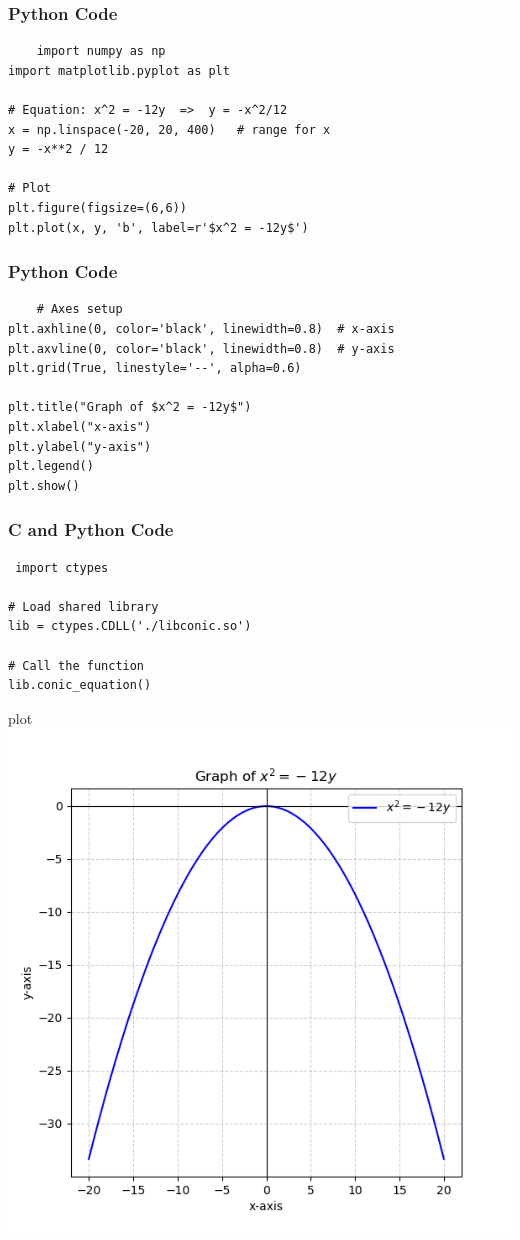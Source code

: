 \documentclass{beamer}
\begin{document}
\begin{frame}[fragile]
\frametitle{Python Code}
\begin{lstlisting}
    import numpy as np
import matplotlib.pyplot as plt

# Equation: x^2 = -12y  =>  y = -x^2/12
x = np.linspace(-20, 20, 400)   # range for x
y = -x**2 / 12

# Plot
plt.figure(figsize=(6,6))
plt.plot(x, y, 'b', label=r'$x^2 = -12y$')
\end{lstlisting}   
\end{frame}
\begin{frame}[fragile]
\frametitle{Python Code}
\begin{lstlisting}
    # Axes setup
plt.axhline(0, color='black', linewidth=0.8)  # x-axis
plt.axvline(0, color='black', linewidth=0.8)  # y-axis
plt.grid(True, linestyle='--', alpha=0.6)

plt.title("Graph of $x^2 = -12y$")
plt.xlabel("x-axis")
plt.ylabel("y-axis")
plt.legend()
plt.show()

\end{lstlisting}   
\end{frame}
\begin{frame}[fragile]
\frametitle{C and Python Code}
\begin{lstlisting}
 import ctypes

# Load shared library
lib = ctypes.CDLL('./libconic.so')

# Call the function
lib.conic_equation()   
\end{lstlisting}   
\end{frame}
\begin{frame}{plot}
     \centering
    \includegraphics[width=\columnwidth, height=0.8\textheight, keepaspectratio]{Figure_14.png} 
\end{frame}
\end{document}
